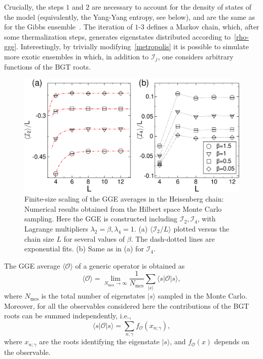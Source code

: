 \documentclass[twocolumn,superscriptaddress,prb,10pt]{revtex4-1}
\begin{document}
Crucially, the steps $1$ and $2$ are necessary to account for the density of states of the model 
(equivalently, the Yang-Yang entropy, see below), 
and are the same as for the Gibbs ensemble~\cite{gu-2005}. The iteration of $1$-$3$ defines a Markov 
chain, which, after some thermalization steps, generates eigenstates distributed according 
to~\eqref{rho-gge}. Interestingly, by trivially modifying~\eqref{metropolis} it is possible to 
simulate more exotic ensembles in which, in addition to ${\mathcal I}_j$, one considers 
arbitrary functions of the BGT roots.  
%
\begin{figure}[t]
\includegraphics*[width=0.93\linewidth]{./fig2}
\caption{Finite-size scaling of the GGE averages in the Heisenberg chain: Numerical results 
 obtained from the Hilbert space Monte Carlo sampling. Here the GGE is constructed including 
 ${\mathcal I}_2,{\mathcal I}_4$, with Lagrange multipliers $\lambda_2=\beta,
 \lambda_4=1$. (a) $\langle {\mathcal I}_2/L\rangle$ plotted versus the chain size 
 $L$ for several values of $\beta$. The dash-dotted lines are exponential fits. (b) Same as 
 in (a) for ${\mathcal I}_4$.
}
\label{fig2}
\end{figure}
%
The GGE average $\langle{\mathcal O}\rangle$ of a generic operator is obtained as  
%
\begin{equation}
\label{gge-mc}
\langle{\mathcal O}\rangle=\lim\limits_{N_\textrm{mcs}\to\infty}\frac{1}
{N_\textrm{mcs}}\sum\limits_{|s\rangle}\langle s|{\mathcal O}
|s\rangle,
\end{equation}
%
where $N_{\textrm{mcs}}$ is the total number of eigenstates $|s\rangle$ sampled in 
the Monte Carlo. Moreover, for all the observables considered here the contributions 
of the BGT roots can be summed independently, i.e., 
%
\begin{equation}
\label{gge-mc-1}
\langle s|{\mathcal O}|s\rangle=\sum\limits_{n,\gamma}f_{{\mathcal O}}(x_{n;\gamma}), 
\end{equation}
%
where $x_{n;\gamma}$ are the roots identifying the eigenstate $|s\rangle$, and 
$f_{{\mathcal O}}(x)$ depends on the observable. 
\end{document}
